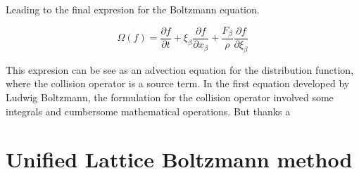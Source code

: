 Leading to the final expresion for the Boltzmann equation.

\begin{equation}
	\Omega(f) = \frac{\partial f}{\partial t} 
	+ \xi_{\beta}\frac{\partial f}{\partial x_{\beta}}
	+ \frac{F_{\beta}}{\rho}\frac{\partial f}{\partial \xi_{\beta}}
\end{equation}

This expresion can be see as an advection equation for the distribution function, 
where the collision operator is a source term.
In the first equation developed by Ludwig Boltzmann, the formulation for 
the collision operator involved some integrals and cumbersome mathematical 
operations. But thanks a  
\section{Unified Lattice Boltzmann method}